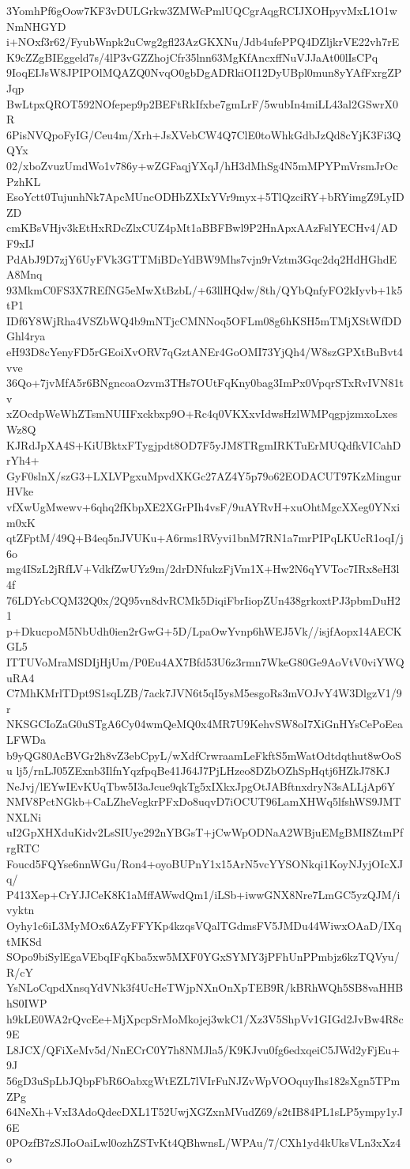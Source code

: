 3YomhPf6gOow7KF3vDULGrkw3ZMWcPmlUQCgrAqgRCIJXOHpyvMxL1O1wNmNHGYD
i+NOxf3r62/FyubWnpk2uCwg2gfl23AzGKXNu/Jdb4ufePPQ4DZljkrVE22vh7rE
K9cZZgBIEggeld7s/4lP3vGZZhojCfr35lnn63MgKfAncxffNuVJJaAt00lIsCPq
9IoqEIJsW8JPIPOlMQAZQ0NvqO0gbDgADRkiOI12DyUBpl0mun8yYAfFxrgZPJqp
BwLtpxQROT592NOfepep9p2BEFtRkIfxbe7gmLrF/5wubIn4miLL43al2GSwrX0R
6PisNVQpoFyIG/Ceu4m/Xrh+JsXVebCW4Q7ClE0toWhkGdbJzQd8cYjK3Fi3QQYx
02/xboZvuzUmdWo1v786y+wZGFaqjYXqJ/hH3dMhSg4N5mMPYPmVrsmJrOcPzhKL
EsoYctt0TujunhNk7ApcMUncODHbZXIxYVr9myx+5TlQzciRY+bRYimgZ9LyIDZD
cmKBsVHjv3kEtHxRDcZlxCUZ4pMt1aBBFBwl9P2HnApxAAzFslYECHv4/ADF9xIJ
PdAbJ9D7zjY6UyFVk3GTTMiBDcYdBW9Mhs7vjn9rVztm3Gqc2dq2HdHGhdEA8Mnq
93MkmC0FS3X7REfNG5eMwXtBzbL/+63llHQdw/8th/QYbQnfyFO2kIyvb+1k5tP1
IDf6Y8WjRha4VSZbWQ4b9mNTjcCMNNoq5OFLm08g6hKSH5mTMjXStWfDDGhl4rya
eH93D8cYenyFD5rGEoiXvORV7qGztANEr4GoOMI73YjQh4/W8szGPXtBuBvt4vve
36Qo+7jvMfA5r6BNgncoaOzvm3THs7OUtFqKny0bag3ImPx0VpqrSTxRvIVN81tv
xZOcdpWeWhZTsmNUIIFxckbxp9O+Rc4q0VKXxvIdwsHzlWMPqgpjzmxoLxesWz8Q
KJRdJpXA4S+KiUBktxFTygjpdt8OD7F5yJM8TRgmIRKTuErMUQdfkVICahDrYh4+
GyF0slnX/szG3+LXLVPgxuMpvdXKGc27AZ4Y5p79o62EODACUT97KzMingurHVke
vfXwUgMwewv+6qhq2fKbpXE2XGrPIh4vsF/9uAYRvH+xuOhtMgcXXeg0YNxim0xK
qtZFptM/49Q+B4eq5nJVUKu+A6rms1RVyvi1bnM7RN1a7mrPIPqLKUcR1oqI/j6o
mg4ISzL2jRfLV+VdkfZwUYz9m/2drDNfukzFjVm1X+Hw2N6qYVToc7IRx8eH3l4f
76LDYcbCQM32Q0x/2Q95vn8dvRCMk5DiqiFbrIiopZUn438grkoxtPJ3pbmDuH21
p+DkucpoM5NbUdh0ien2rGwG+5D/LpaOwYvnp6hWEJ5Vk//isjfAopx14AECKGL5
ITTUVoMraMSDIjHjUm/P0Eu4AX7Bfd53U6z3rmn7WkeG80Ge9AoVtV0viYWQuRA4
C7MhKMrlTDpt9S1sqLZB/7ack7JVN6t5qI5ysM5esgoRs3mVOJvY4W3DlgzV1/9r
NKSGCIoZaG0uSTgA6Cy04wmQeMQ0x4MR7U9KehvSW8oI7XiGnHYsCePoEeaLFWDa
b9yQG80AcBVGr2h8vZ3ebCpyL/wXdfCrwraamLeFkftS5mWatOdtdqthut8wOoSu
lj5/rnLJ05ZExnb3IlfnYqzfpqBe41J64J7PjLHzeo8DZbOZhSpHqtj6HZkJ78KJ
NeJvj/lEYwIEvKUqTbw5I3aJcue9qkTg5xIXkxJpgOtJABftnxdryN3sALLjAp6Y
NMV8PctNGkb+CaLZheVegkrPFxDo8uqvD7iOCUT96LamXHWq5lfshWS9JMTNXLNi
uI2GpXHXduKidv2LsSIUye292nYBGsT+jCwWpODNaA2WBjuEMgBMI8ZtmPfrgRTC
Foucd5FQYse6nnWGu/Ron4+oyoBUPnY1x15ArN5vcYYSONkqi1KoyNJyjOIcXJq/
P413Xep+CrYJJCeK8K1aMffAWwdQm1/iLSb+iwwGNX8Nre7LmGC5yzQJM/ivyktn
Oyhy1c6iL3MyMOx6AZyFFYKp4kzqsVQalTGdmsFV5JMDu44WiwxOAaD/IXqtMKSd
SOpo9biSylEgaVEbqIFqKba5xw5MXF0YGxSYMY3jPFhUnPPmbjz6kzTQVyu/R/cY
YsNLoCqpdXnsqYdVNk3f4UcHeTWjpNXnOnXpTEB9R/kBRhWQh5SB8vaHHBhS0IWP
h9kLE0WA2rQvcEe+MjXpcpSrMoMkojej3wkC1/Xz3V5ShpVv1GIGd2JvBw4R8c9E
L8JCX/QFiXeMv5d/NnECrC0Y7h8NMJla5/K9KJvu0fg6edxqeiC5JWd2yFjEu+9J
56gD3uSpLbJQbpFbR6OabxgWtEZL7lVIrFuNJZvWpVOOquyIhs182sXgn5TPmZPg
64NeXh+VxI3AdoQdecDXL1T52UwjXGZxnMVudZ69/s2tIB84PL1sLP5ympy1yJ6E
0POzfB7zSJIoOaiLwl0ozhZSTvKt4QBhwnsL/WPAu/7/CXh1yd4kUksVLn3xXz4o
